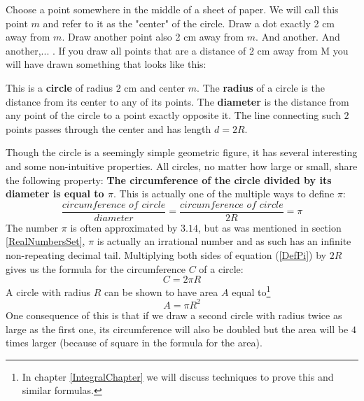 \noindent Choose a point somewhere in the middle of a sheet of paper. We will call this point $m$ and refer to it as the "center" of the circle.  Draw a dot exactly 2 cm away from $m$. Draw another point also 2 cm away from $m$. And another. And another,... . If you draw all points that are a distance of 2 cm away from M you will have drawn something that looks like this:
\begin{center}
\end{center}
\noindent This is a \textbf{circle} of radius $2$ cm and center $m$. The \textbf{radius} of a circle is the distance from its center to any of its points. The \textbf{diameter} is the distance from any point of the circle to a point exactly opposite it. The line connecting such $2$ points passes through the center and has length $d = 2R$.
\begin{center}
\end{center}
\noindent Though the circle is a seemingly simple geometric figure, it has several interesting and some non-intuitive properties. All circles, no matter how large or small, share the following property: \textbf{The circumference of the circle divided by its diameter is equal to $\pi$}. This is actually one of the multiple ways to define $\pi$:
\begin{equation}
\label{DefPi}
\frac{\textit{circumference of circle}}{\textit{diameter}} = \frac{\textit{circumference of circle}}{2 R} = \pi
\end{equation}
\noindent The number $\pi$ is often approximated by $3.14$, but as was mentioned in section \ref{RealNumbersSet}, $\pi$ is actually an irrational number and as such has an infinite non-repeating decimal tail. Multiplying both sides of equation (\ref{DefPi}) by $2R$ gives us the formula for the circumference $C$ of a circle:
\begin{equation}
\label{CircumCirc}
C = 2 \pi R
\end{equation}
A circle with radius $R$ can be shown to have area $A$ equal to\footnote{In chapter \ref{IntegralChapter} we will discuss techniques to prove this and similar formulas.}
\begin{equation}
A = \pi R^2
\end{equation}
\noindent One consequence of this is that if we draw a second circle with radius twice as large as the first one, its circumference will also be doubled but the area will be $4$ times larger (because of square in the formula for the area).


